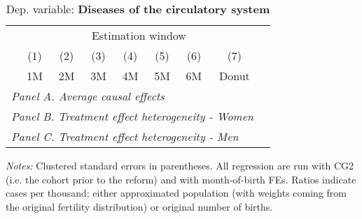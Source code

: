  \begin{table}[H] \begin{threeparttable} \centering \caption{Dep. variable: \textbf{Diseases of the circulatory system}} {\def\sym#1{\ifmmode^{#1}\else\(^{#1}\)\fi} \begin{tabular}{l*{8}{c}} \toprule & \multicolumn{7}{c}{Estimation window} \\ \cmidrule(lr){2-8}
            &\multicolumn{1}{c}{(1)}&\multicolumn{1}{c}{(2)}&\multicolumn{1}{c}{(3)}&\multicolumn{1}{c}{(4)}&\multicolumn{1}{c}{(5)}&\multicolumn{1}{c}{(6)}&\multicolumn{1}{c}{(7)}\\
            &\multicolumn{1}{c}{1M}&\multicolumn{1}{c}{2M}&\multicolumn{1}{c}{3M}&\multicolumn{1}{c}{4M}&\multicolumn{1}{c}{5M}&\multicolumn{1}{c}{6M}&\multicolumn{1}{c}{Donut}\\
\midrule
 \multicolumn{8}{l}{\emph{Panel A. Average causal effects}} \\       \midrule\multicolumn{8}{l}{\emph{Panel B. Treatment effect heterogeneity - Women}} \\       \midrule\multicolumn{8}{l}{\emph{Panel C. Treatment effect heterogeneity - Men}} \\       
\bottomrule \end{tabular} } \begin{tablenotes} \item \scriptsize \emph{Notes:} Clustered standard errors in parentheses. All regression are run with CG2 (i.e. the cohort prior to the reform) and with month-of-birth FEs. Ratios indicate cases per thousand; either approximated population (with weights coming from the original fertility distribution) or original number of births. \end{tablenotes} \end{threeparttable} \end{table} 
